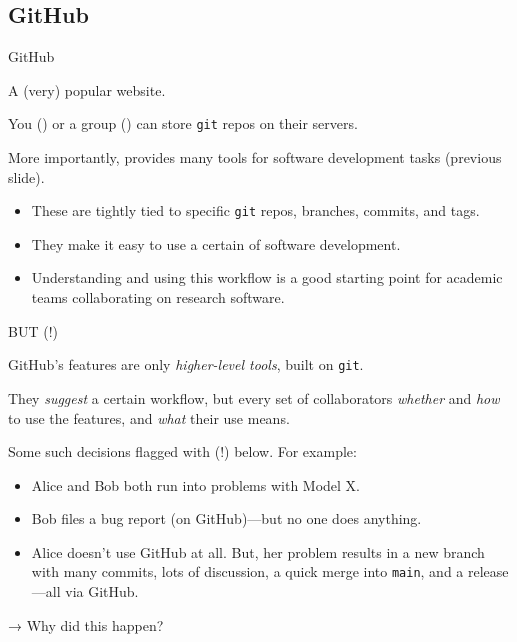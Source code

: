 \documentclass[12pt,aspectratio=169]{beamer}
\begin{document}
\subsection{GitHub}
\begin{frame}{GitHub}

  A (very) popular website.

  \bigskip
  You () or a group () can store \texttt{git} repos on their servers.

  \bigskip
  More importantly, provides many tools for software development tasks (previous slide).
  \begin{itemize}
    \item These are tightly tied to specific \texttt{git} repos, branches, commits, and tags.
    \item They make it easy to use a certain  of software development.
    \item Understanding and using this workflow is a good starting point for academic teams collaborating on research software.
  \end{itemize}

\end{frame}

\begin{frame}{BUT (!)}

  GitHub's features are only \emph{higher-level tools}, built on \texttt{git}.

  \bigskip
  They \emph{suggest} a certain workflow, but every set of collaborators  \emph{whether} and \emph{how} to use the features, and \emph{what} their use means.

  \bigskip
  Some such decisions flagged with \alert{(!)} below.
  For example:

  \begin{itemize}
    \item Alice and Bob both run into problems with Model X.
    \item Bob files a bug report (on GitHub)—but no one does anything.
    \item Alice doesn't use GitHub at all. But, her problem results in a new branch with many commits, lots of discussion, a quick merge into \texttt{main}, and a release—all via GitHub.
  \end{itemize}

  → Why did this happen?

\end{frame}
\end{document}
